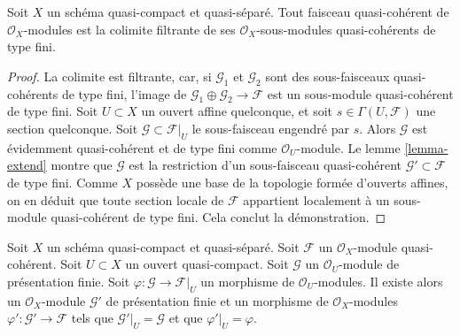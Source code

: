 \begin{lemma}
\label{lemma-quasi-coherent-colimit-finite-type}
Soit $X$ un schéma quasi-compact et quasi-séparé.
Tout faisceau quasi-cohérent de $\mathcal{O}_X$-modules
est la colimite filtrante de ses
$\mathcal{O}_X$-sous-modules quasi-cohérents de type fini.
\end{lemma}

\begin{proof}
La colimite est filtrante, car, si $\mathcal{G}_1$ et $\mathcal{G}_2$
sont des sous-faisceaux quasi-cohérents de type fini, l'image de
$\mathcal{G}_1 \oplus \mathcal{G}_2 \to \mathcal{F}$ est
un sous-module quasi-cohérent de type fini.
Soit $U \subset X$ un ouvert affine quelconque, et soit
$s \in \Gamma(U, \mathcal{F})$ une section quelconque.
Soit $\mathcal{G} \subset \mathcal{F}|_U$ le
sous-faisceau engendré par $s$. Alors $\mathcal{G}$
est évidemment quasi-cohérent et de type fini comme $\mathcal{O}_U$-module.
Le lemme \ref{lemma-extend} montre que $\mathcal{G}$ est la restriction
d'un sous-faisceau quasi-cohérent $\mathcal{G}' \subset \mathcal{F}$
de type fini. Comme $X$ possède une base de la topologie formée
d'ouverts affines, on en déduit que toute section locale de
$\mathcal{F}$ appartient localement à un sous-module quasi-cohérent
de type fini. Cela conclut la démonstration.
\end{proof}

\begin{lemma}
\label{lemma-extend-finite-presentation}
Soit $X$ un schéma quasi-compact et quasi-séparé.
Soit $\mathcal{F}$ un $\mathcal{O}_X$-module quasi-cohérent.
Soit $U \subset X$ un ouvert quasi-compact.
Soit $\mathcal{G}$ un $\mathcal{O}_U$-module de présentation finie.
Soit $\varphi : \mathcal{G} \to \mathcal{F}|_U$ un morphisme de
$\mathcal{O}_U$-modules.
Il existe alors un $\mathcal{O}_X$-module
$\mathcal{G}'$ de présentation finie et un morphisme
de $\mathcal{O}_X$-modules $\varphi' : \mathcal{G}' \to \mathcal{F}$
tels que $\mathcal{G}'|_U = \mathcal{G}$ et que
$\varphi'|_U = \varphi$.
\end{lemma}

